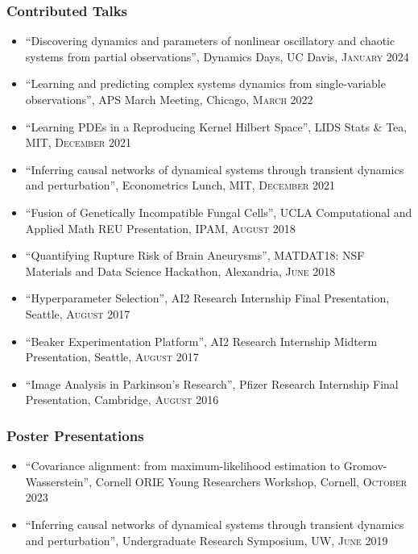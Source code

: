 \documentclass[a4paper,10pt]{article}
\newcommand{\faPaperclip}{{\ResumeLinkFont\symbol{"F0C6}}}
\begin{document}
\subsubsection*{Contributed Talks}
\begin{itemize}
\item ``Discovering dynamics and parameters of nonlinear oscillatory and chaotic systems from partial observations'', Dynamics Days, UC Davis, \textsc{January} 2024

\item ``Learning and predicting complex systems dynamics from single-variable observations'', APS March Meeting, Chicago, \textsc{March} 2022

\item ``Learning PDEs in a Reproducing Kernel Hilbert Space'', LIDS Stats \& Tea, MIT, \textsc{December} 2021

\item ``Inferring causal networks of dynamical systems through transient dynamics and perturbation'', Econometrics Lunch, MIT, \textsc{December} 2021

\item ``Fusion of Genetically Incompatible Fungal Cells'', UCLA Computational and Applied Math REU Presentation, IPAM, \textsc{August} 2018

\item ``Quantifying Rupture Risk of Brain Aneurysms'', MATDAT18: NSF Materials and Data Science Hackathon, Alexandria, \textsc{June} 2018 \href{\detokenize{https://matdat18.wordpress.ncsu.edu/files/2018/06/Team12.pdf}}{\faPaperclip}

\item ``Hyperparameter Selection'', AI2 Research Internship Final Presentation, Seattle, \textsc{August} 2017

\item ``Beaker Experimentation Platform'', AI2 Research Internship Midterm Presentation, Seattle, \textsc{August} 2017

\item ``Image Analysis in Parkinson's Research'', Pfizer Research Internship Final Presentation, Cambridge, \textsc{August} 2016
\end{itemize}

\subsubsection*{Poster Presentations}
\begin{itemize}
\item ``Covariance alignment: from maximum-likelihood estimation to Gromov-Wasserstein'', Cornell ORIE Young Researchers Workshop, Cornell, \textsc{October} 2023

\item ``Inferring causal networks of dynamical systems through transient dynamics and perturbation'', Undergraduate Research Symposium, UW, \textsc{June} 2019
\end{itemize}
\end{document}
